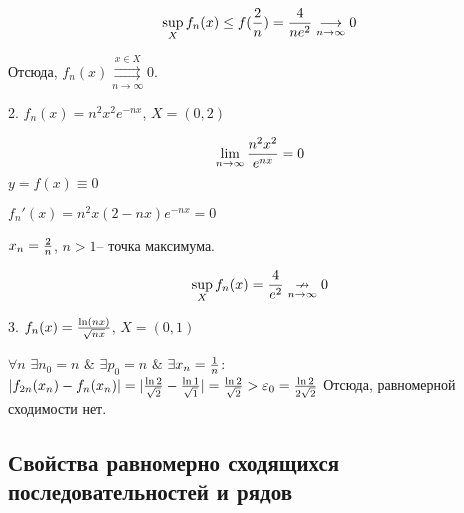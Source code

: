 \documentclass[a4paper,12pt]{article} %
\begin{document}
$$\sup_{X}f_n(x) \leq f({2\over n}) = {4\over ne^2} \underset{n \rightarrow \infty}{\longrightarrow} 0 $$ \newline

Отсюда, $f_n(x) \overset{x \in X}{\underset{n \rightarrow \infty}{\rightrightarrows}} 0$.

2. $f_n(x) = n^2x^2e^{-nx}$, $X = (0,2)$ \newline

$$\lim_{n \rightarrow \infty}{n^2x^2 \over e^{nx}} = 0$$ \Rightarrow $y=f(x)\equiv0$ \newline

$f_n'(x) = n^2x(2-nx)e^{-nx} = 0$ \newline

\hspace*{5mm}$x_n = { 2\over n}$,  $n>1$-- точка максимума. \Rightarrow

$$\sup_{X}f_n(x) = {4\over e^2} \underset{n \rightarrow \infty}{\nrightarrow} 0 $$ \newline

3. $f_n(x) = {{\ln(nx)} \over {\sqrt{nx}}}$, $X = (0,1)$ \newline

$\forall n$ $\exists n_0 = n$ $\&$ $\exists p_0 = n$ $\&$ $\exists x_n = {1 \over n}$:
\\[5 mm]
$|f_{2n}(x_n) - f_n(x_n)| = |{\ln{2}\over{\sqrt{2}}} - {\ln{1}\over{\sqrt{1}}}| = {\ln{2}\over{\sqrt{2}}} > \varepsilon_0 = {\ln{2}\over{2\sqrt{2}}}$ \newline
Отсюда, равномерной сходимости нет.





\subsection{Свойства равномерно сходящихся последовательностей и рядов}
\end{document}
